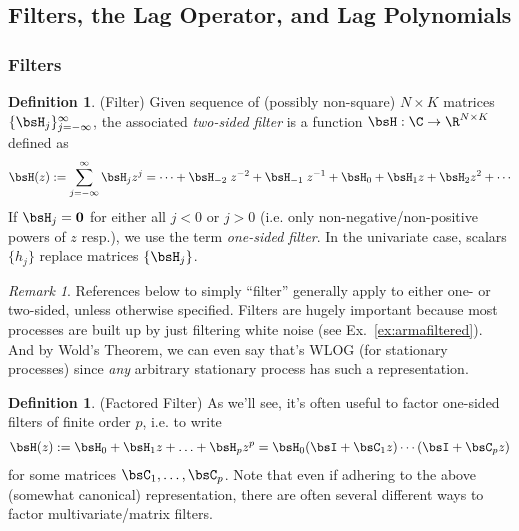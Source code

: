 \documentclass[12pt]{article}
\theoremstyle{plain}
\theoremstyle{definition}
\newtheorem{defn}[thm]{Definition}
\theoremstyle{remark}
\newtheorem*{rmk}{Remark}
\newcommand{\ra}{\rightarrow}
\renewcommand{\bso}{\boldsymbol{0}}
\begin{document}
\clearpage
\subsection{Filters, the Lag Operator, and Lag Polynomials}

\subsubsection{Filters}

\begin{defn}(Filter)
Given sequence of (possibly non-square) $N\times K$ matrices
$\{\bsH_j\}_{j=-\infty}^\infty$, the associated
\emph{two-sided filter} is a function $\bsH:\C\ra\R^{N\times K}$ defined
as
\begin{align*}
  \bsH(z)
  := \sum_{j=-\infty}^\infty \bsH_j z^j
  = \cdots + \bsH_{-2}\;z^{-2} + \bsH_{-1}\;z^{-1} +
    \bsH_0 + \bsH_1 z + \bsH_2z^2 + \cdots
\end{align*}
If $\bsH_{j}=\bso$ for either all $j<0$ or $j>0$ (i.e. only
non-negative/non-positive powers of $z$ resp.), we use the term
\emph{one-sided filter}.
In the univariate case, scalars $\{h_j\}$ replace matrices $\{\bsH_j\}$.
\end{defn}
\begin{rmk}
References below to simply ``filter'' generally apply to either one- or
two-sided, unless otherwise specified.
Filters are hugely important because most processes are built up by
just filtering white noise (see Ex.~\ref{ex:armafiltered}).  And by
Wold's Theorem, we can even say that's WLOG (for stationary processes)
since \emph{any} arbitrary stationary process has such a representation.
\end{rmk}

\begin{defn}(Factored Filter)
\label{defn:factoredfilter}
As we'll see, it's often useful to factor one-sided filters of finite
order $p$, i.e. to write
\begin{align*}
  \bsH(z)
  := \bsH_0 + \bsH_1 z+ \ldots + \bsH_pz^p
  = \bsH_0(\bsI+\bsC_1 z)\cdots(\bsI+\bsC_pz)
\end{align*}
for some matrices $\bsC_1,\ldots,\bsC_p$.
Note that even if adhering to the above (somewhat canonical)
representation, there are often several different ways to factor
multivariate/matrix filters.
\end{defn}
\end{document}
